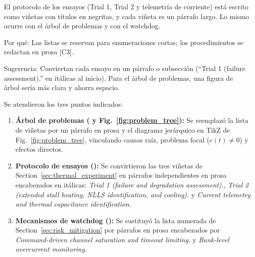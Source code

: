 \documentclass{LabDSTresponse}
\begin{document}
{El protocolo de los ensayos (Trial 1, Trial 2 y telemetría de corriente) está escrito como viñetas con títulos en negritas, y cada viñeta es un párrafo largo. Lo mismo ocurre con el árbol de problemas y con el watchdog.

Por qué: Las listas se reservan para enumeraciones cortas; los procedimientos se redactan en prosa [C3].

Sugerencia: Conviertan cada ensayo en un párrafo o subsección (“Trial 1 (failure assessment).” en itálicas al inicio). Para el árbol de problemas, una figura de árbol sería más clara y ahorra espacio.}
{Se atendieron los tres puntos indicados:
\begin{enumerate}
    \item \textbf{Árbol de problemas ( y Fig.~\ref{fig:problem_tree}):} Se reemplazó la lista de viñetas por un párrafo en prosa y el diagrama jerárquico en TikZ de Fig.~\ref{fig:problem_tree}, vinculando causas raíz, problema focal ($e(t) \neq 0$) y efectos directos.
    \item \textbf{Protocolo de ensayos ():} Se convirtieron las tres viñetas de Section~\ref{sec:thermal_experiment} en párrafos independientes en prosa encabezados en itálicas: \textit{Trial 1 (failure and degradation assessment).}, \textit{Trial 2 (extended stall heating, NLLS identification, and cooling).} y \textit{Current telemetry and thermal capacitance identification.}
    \item \textbf{Mecanismos de watchdog ():} Se sustituyó la lista numerada de Section~\ref{sec:risk_mitigation} por párrafos en prosa encabezados por \textit{Command-driven channel saturation and timeout limiting.} y \textit{Bank-level overcurrent monitoring.}
\end{enumerate}}

\end{document}
